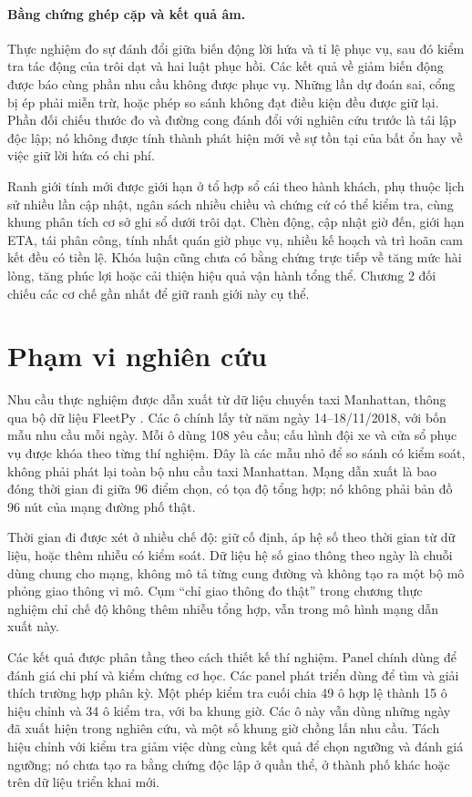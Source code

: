 \paragraph{Bằng chứng ghép cặp và kết quả âm.}
Thực nghiệm đo sự đánh đổi giữa biến động lời hứa và tỉ lệ phục vụ, sau đó kiểm tra tác động
của trôi dạt và hai luật phục hồi. Các kết quả về giảm biến động được báo cùng phần nhu cầu
không được phục vụ. Những lần dự đoán sai, cổng bị ép phải miễn trừ, hoặc phép so sánh không
đạt điều kiện đều được giữ lại. Phần đối chiếu thước đo và đường cong đánh đổi với nghiên
cứu trước là tái lập độc lập; nó không được tính thành phát hiện mới về sự tồn tại của
bất ổn hay về việc giữ lời hứa có chi phí.

Ranh giới tính mới được giới hạn ở tổ hợp sổ cái theo hành khách, phụ thuộc lịch sử nhiều
lần cập nhật, ngân sách nhiều chiều và chứng cứ có thể kiểm tra, cùng khung phân tích cơ sở
ghi sổ dưới trôi dạt. Chèn động, cập nhật giờ đến, giới hạn ETA, tái phân công, tính nhất quán
giờ phục vụ, nhiều kế hoạch và trì hoãn cam kết đều có tiền lệ. Khóa luận cũng chưa có bằng
chứng trực tiếp về tăng mức hài lòng, tăng phúc lợi hoặc cải thiện hiệu quả vận hành tổng thể.
Chương 2 đối chiếu các cơ chế gần nhất để giữ ranh giới này cụ thể.

\section{Phạm vi nghiên cứu}

Nhu cầu thực nghiệm được dẫn xuất từ dữ liệu chuyến taxi Manhattan, thông qua bộ dữ liệu
FleetPy \cite{fleetpy2026}. Các ô chính lấy từ năm ngày 14--18/11/2018, với bốn mẫu nhu cầu mỗi ngày. Mỗi ô
dùng 108 yêu cầu; cấu hình đội xe và cửa sổ phục vụ được khóa theo từng thí nghiệm.
Đây là các mẫu nhỏ để so sánh có kiểm soát, không phải phát lại toàn bộ nhu cầu taxi
Manhattan. Mạng dẫn xuất là bao đóng thời gian đi giữa 96 điểm chọn, có tọa độ tổng hợp;
nó không phải bản đồ 96 nút của mạng đường phố thật.

Thời gian đi được xét ở nhiều chế độ: giữ cố định, áp hệ số theo thời gian từ dữ liệu,
hoặc thêm nhiễu có kiểm soát. Dữ liệu hệ số giao thông theo ngày là chuỗi dùng chung cho
mạng, không mô tả từng cung đường và không tạo ra một bộ mô phỏng giao thông vi mô. Cụm
``chỉ giao thông đo thật'' trong chương thực nghiệm chỉ chế độ không thêm nhiễu tổng hợp,
vẫn trong mô hình mạng dẫn xuất này.

Các kết quả được phân tầng theo cách thiết kế thí nghiệm. Panel chính dùng để đánh giá
chi phí và kiểm chứng cơ học. Các panel phát triển dùng để tìm và giải thích trường hợp
phân kỳ. Một phép kiểm tra cuối chia 49 ô hợp lệ thành 15 ô hiệu chỉnh và 34 ô kiểm tra,
với ba khung giờ. Các ô này vẫn dùng những ngày đã xuất hiện trong nghiên cứu, và một số
khung giờ chồng lấn nhu cầu. Tách hiệu chỉnh với kiểm tra giảm việc dùng cùng kết quả để
chọn ngưỡng và đánh giá ngưỡng; nó chưa tạo ra bằng chứng độc lập ở quần thể, ở thành phố
khác hoặc trên dữ liệu triển khai mới.

